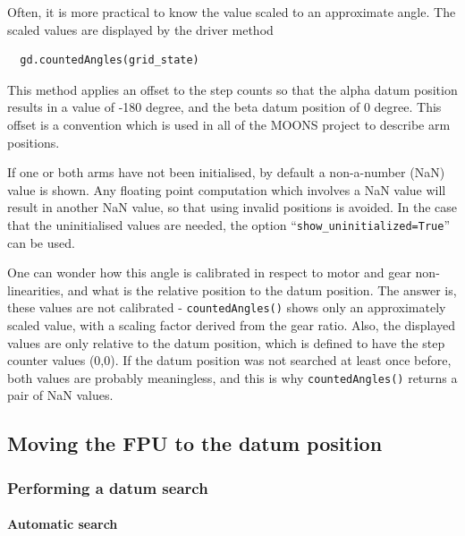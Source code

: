 \documentclass[11pt,a4paper]{scrartcl}
\begin{document}
Often, it is more practical to know the value scaled to an approximate
angle. The scaled values are displayed by the driver method
\begin{verbatim}
  gd.countedAngles(grid_state)
\end{verbatim}
This method applies an offset to the step counts so that the alpha
datum position results in a value of -180 degree, and the beta datum
position of 0 degree. This offset is a convention which is used in all
of the MOONS project to describe arm positions.


If one or both arms have not been initialised, by default a
non-a-number (NaN) value is shown. Any floating point computation
which involves a NaN value will result in another NaN value, so that
using invalid positions is avoided.  In the case that the
uninitialised values are needed, the option
``\texttt{show\_uninitialized=True}'' can be used.


One can wonder how this angle is calibrated in respect to motor and
gear non-linearities, and what is the relative position to the datum
position. The answer is, these values are not calibrated -
\texttt{countedAngles()} shows only an approximately scaled value,
with a scaling factor derived from the gear ratio.  Also, the
displayed values are only relative to the datum position, which is
defined to have the step counter values (0,0). If the datum position
was not searched at least once before, both values are probably
meaningless, and this is why \texttt{countedAngles()} returns a pair
of NaN values.




\subsection{Moving the FPU to the datum position}
\label{sec:finddatumreference}
\subsubsection{Performing a datum search}

\paragraph{Automatic search}
\end{document}
